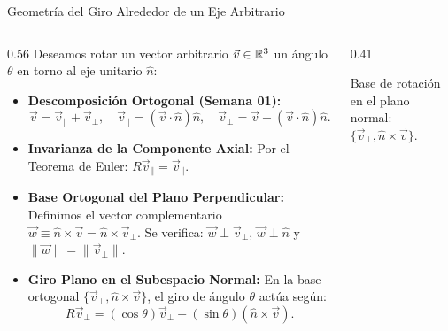 \documentclass[10pt,aspectratio=169]{beamer}
\begin{document}
\begin{frame}{Geometría del Giro Alrededor de un Eje Arbitrario}
  \begin{columns}[c]
    \begin{column}{0.56\textwidth}
      \footnotesize
      Deseamos rotar un vector arbitrario $\vec{v} \in \mathbb{R}^3$ un ángulo $\theta$ en torno al eje unitario $\hat{n}$:
      \begin{itemize}\itemsep2pt
        \item \textbf{Descomposición Ortogonal (Semana 01):}
        \[
        \vec{v} = \vec{v}_\parallel + \vec{v}_\perp, \quad \vec{v}_\parallel = (\vec{v}\cdot\hat{n})\hat{n}, \quad \vec{v}_\perp = \vec{v} - (\vec{v}\cdot\hat{n})\hat{n}.
        \]
        \item \textbf{Invarianza de la Componente Axial:}
        Por el Teorema de Euler: $R\vec{v}_\parallel = \vec{v}_\parallel$.
        \item \textbf{Base Ortogonal del Plano Perpendicular:}
        Definimos el vector complementario $\vec{w} \equiv \hat{n} \times \vec{v} = \hat{n} \times \vec{v}_\perp$.
        Se verifica: $\vec{w} \perp \vec{v}_\perp$, $\vec{w} \perp \hat{n}$ y $\|\vec{w}\| = \|\vec{v}_\perp\|$.
        \item \textbf{Giro Plano en el Subespacio Normal:}
        En la base ortogonal $\{\vec{v}_\perp, \hat{n}\times\vec{v}\}$, el giro de ángulo $\theta$ actúa según:
        \[
        R\vec{v}_\perp = (\cos\theta)\vec{v}_\perp + (\sin\theta)(\hat{n}\times\vec{v}).
        \]
      \end{itemize}
    \end{column}
    \begin{column}{0.41\textwidth}
      \centering
      \vspace{0.1cm}
      {\scriptsize Base de rotación en el plano normal: $\{\vec{v}_\perp, \hat{n}\times\vec{v}\}$.}
    \end{column}
  \end{columns}
\end{frame}
\end{document}
